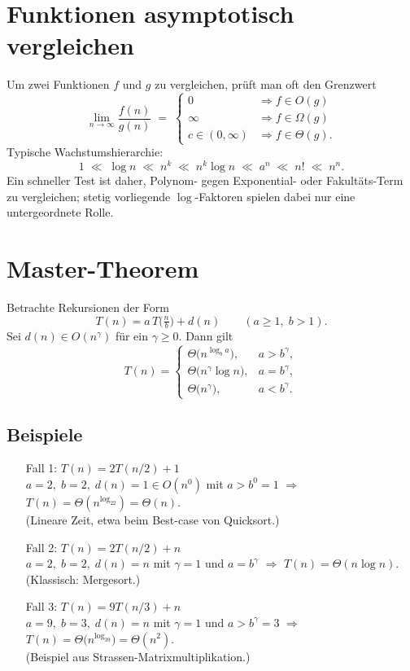 \section{Funktionen asymptotisch vergleichen}
Um zwei Funktionen $f$ und $g$ zu vergleichen, prüft man oft den Grenzwert
\[\lim_{n\to\infty} \frac{f(n)}{g(n)}\;=\;\begin{cases}
  0 &\Rightarrow f\in O(g)\\[4pt]
  \infty &\Rightarrow f\in \Omega(g)\\[4pt]
  c\in(0,\infty) &\Rightarrow f\in \Theta(g).
\end{cases}\]
Typische Wachstumshierarchie:
\[1\;\ll\; \log\!n\;\ll\; n^k\;\ll\; n^k\log n\;\ll\; a^n\;\ll\; n!\;\ll\; n^{n}.\]
Ein schneller Test ist daher, Polynom- gegen Exponential- oder Fakultäts-Term
zu vergleichen; stetig vorliegende $\log$-Faktoren spielen dabei nur eine
untergeordnete Rolle.

\section{Master-Theorem}
Betrachte Rekursionen der Form
\[T(n)=a\,T\!\bigl(\tfrac{n}{b}\bigr)+d(n)\qquad(a\ge1,\;b>1).\]
Sei $d(n)\in O(n^{\gamma})$ für ein $\gamma\ge0$. Dann gilt
\[
T(n)=\begin{cases}
  \Theta\bigl(n^{\log_b a}\bigr), & a> b^{\gamma},\\[4pt]
  \Theta\bigl(n^{\gamma}\log n\bigr), & a= b^{\gamma},\\[4pt]
  \Theta\bigl(n^{\gamma}\bigr), & a< b^{\gamma}.
\end{cases}
\]
\subsection*{Beispiele}
\begin{enumerate}
  \item[Fall 1:] $T(n)=2T(n/2)+1$\\
        $a=2,\;b=2,\;d(n)=1\in O(n^{0})$ mit $a>b^{0}=1$ $\Rightarrow$
        $T(n)=\Theta(n^{\log_22})=\Theta(n)$.\\
        (Lineare Zeit, etwa beim Best-case von Quicksort.)
  \item[Fall 2:] $T(n)=2T(n/2)+n$\\
        $a=2,\;b=2,\;d(n)=n$ mit $\gamma=1$ und $a=b^{\gamma}$ $\Rightarrow$
        $T(n)=\Theta(n\log n)$.\\
        (Klassisch: Mergesort.)
  \item[Fall 3:] $T(n)=9T(n/3)+n$\\
        $a=9,\;b=3,\;d(n)=n$ mit $\gamma=1$ und $a>b^{\gamma}=3$ $\Rightarrow$
        $T(n)=\Theta\bigl(n^{\log_39}\bigr)=\Theta(n^{2})$.\\
        (Beispiel aus Strassen-Matrixmultiplikation.)
\end{enumerate}


